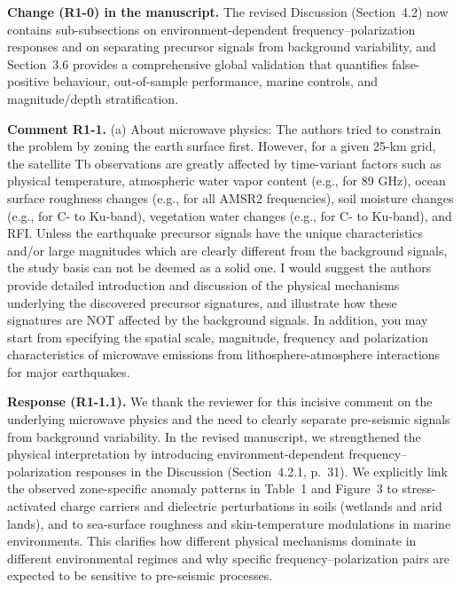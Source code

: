 \documentclass[12pt]{article}
\newcommand{\revcomment}[1]{\begingroup\color{commentcolor}#1\endgroup}
\newcommand{\revresponse}[1]{\begingroup\color{responsecolor}#1\endgroup}
\newcommand{\revchange}[1]{\begingroup\color{changecolor}#1\endgroup}
\begin{document}
\revchange{%
\textbf{Change (R1-0) in the manuscript.}
The revised Discussion (Section~4.2) now contains sub-subsections on environment-dependent frequency--polarization responses and on separating precursor signals from background variability, and Section~3.6 provides a comprehensive global validation that quantifies false-positive behaviour, out-of-sample performance, marine controls, and magnitude/depth stratification.
}

\bigskip

\revcomment{%
\textbf{Comment R1-1.} (a) About microwave physics: The authors tried to constrain the problem by zoning the earth surface first. However, for a given 25-km grid, the satellite Tb observations are greatly affected by time-variant factors such as physical temperature, atmospheric water vapor content (e.g., for 89 GHz), ocean surface roughness changes (e.g., for all AMSR2 frequencies), soil moisture changes (e.g., for C- to Ku-band), vegetation water changes (e.g., for C- to Ku-band), and RFI. Unless the earthquake precursor signals have the unique characteristics and/or large magnitudes which are clearly different from the background signals, the study basis can not be deemed as a solid one. I would suggest the authors provide detailed introduction and discussion of the physical mechanisms underlying the discovered precursor signatures, and illustrate how these signatures are NOT affected by the background signals. In addition, you may start from specifying the spatial scale, magnitude, frequency and polarization characteristics of microwave emissions from lithosphere-atmosphere interactions for major earthquakes.
}

\revresponse{%
\textbf{Response (R1-1.1).} We thank the reviewer for this incisive comment on the underlying microwave physics and the need to clearly separate pre-seismic signals from background variability. In the revised manuscript, we strengthened the physical interpretation by introducing environment-dependent frequency--polarization responses in the Discussion (Section~4.2.1, p.~31). We explicitly link the observed zone-specific anomaly patterns in Table~1 and Figure~3 to stress-activated charge carriers and dielectric perturbations in soils (wetlands and arid lands), and to sea-surface roughness and skin-temperature modulations in marine environments. This clarifies how different physical mechanisms dominate in different environmental regimes and why specific frequency--polarization pairs are expected to be sensitive to pre-seismic processes.
}
\end{document}
